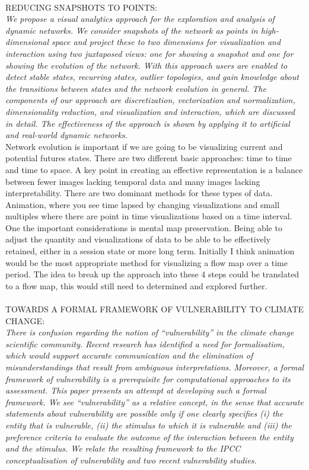 \\
REDUCING SNAPSHOTS TO POINTS: ~\cite{van2016reducing}\\
\textit{We propose a visual analytics approach for the exploration and analysis of dynamic networks. We consider snapshots of the network as points in high-dimensional space and project these to two dimensions for visualization and interaction using two juxtaposed views: one for showing a snapshot and one for showing the evolution of the network. With this approach users are enabled to detect stable states, recurring states, outlier topologies, and gain knowledge about the transitions between states and the network evolution in general. The components of our approach are discretization, vectorization and normalization, dimensionality reduction, and visualization and interaction, which are discussed in detail. The effectiveness of the approach is shown by applying it to artificial and real-world dynamic networks.}\\
Network evolution is important if we are going to be visualizing current and potential futures states. There are two different basic approaches: time to time and time to space. A key point in creating an effective representation is a balance between fewer images lacking temporal data and many images lacking interpretability. There are two dominant methods for these types of data. Animation, where you see time lapsed by changing visualizations and small multiples where there are point in time visualizations based on a time interval. One the important considerations is mental map preservation. Being able to adjust the quantity and visualizations of data to be able to be effectively retained, either in a session state or more long term. Initially I think animation would be the most appropriate method for visualizing a flow map over a time period. The idea to break up the approach into these 4 steps could be translated to a flow map, this would still need to determined and explored further.\\\textsl{}
\\
TOWARDS A FORMAL FRAMEWORK OF VULNERABILITY TO CLIMATE CHANGE: ~\cite{ionescu2009towards}\\
\textit{There is confusion regarding the notion of “vulnerability” in the climate change scientific community. Recent research has identified a need for formalisation, which would support accurate communication and the elimination of misunderstandings that result from ambiguous interpretations. Moreover, a formal framework of vulnerability is a prerequisite for computational approaches to its assessment. This paper presents an attempt at developing such a formal framework. We see “vulnerability” as a relative concept, in the sense that accurate statements about vulnerability are possible only if one clearly specifies (i) the entity that is vulnerable, (ii) the stimulus to which it is vulnerable and (iii) the preference criteria to evaluate the outcome of the interaction between the entity and the stimulus. We relate the resulting framework to the IPCC conceptualisation of vulnerability and two recent vulnerability studies.}\\
